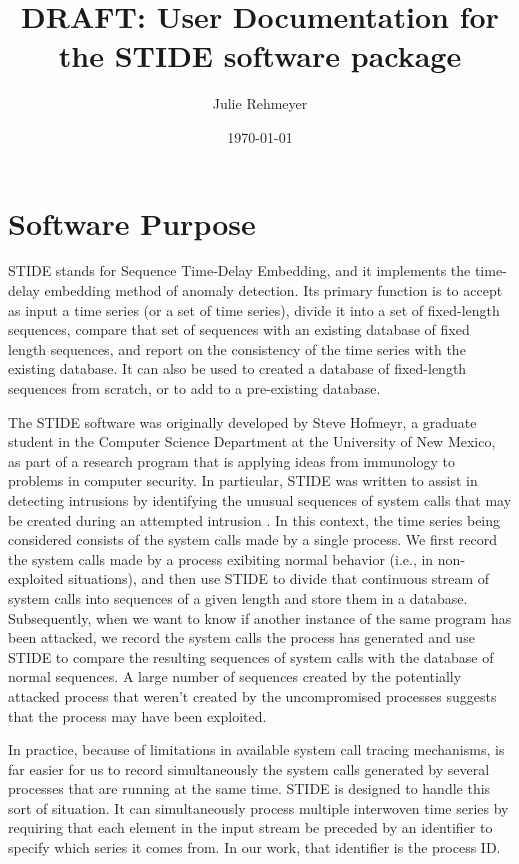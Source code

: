 \documentclass{amsart}
\title{DRAFT: User Documentation for the STIDE software package}
\author{Julie Rehmeyer}
\date{\today}
\begin{document}
\maketitle 


\section{Software Purpose} \label{sec:intro}
STIDE stands for Sequence Time-Delay Embedding, and it implements the
time-delay embedding method of anomaly detection.  Its primary
function is to accept as input a time series (or a set of time
series), divide it into a set of fixed-length sequences, compare that
set of sequences with an existing database of fixed length sequences,
and report on the consistency of the time series with the existing
database.  It can also be used to created a database of fixed-length
sequences from scratch, or to add to a pre-existing database.

The STIDE software was originally developed by Steve Hofmeyr, a
graduate student in the Computer Science Department at the University
of New Mexico, as part of a research program that is applying ideas
from immunology to problems in computer security.  In particular,
STIDE was written to assist in detecting intrusions by identifying the
unusual sequences of system calls that may be created during an
attempted intrusion \cite{lightweight, ci, principles, self}. In this
context, the time series being considered consists of the system calls
made by a single process.  We first record the system calls made by a
process exibiting normal behavior (i.e., in non-exploited situations),
and then use STIDE to divide that continuous stream of system calls
into sequences of a given length and store them in a database.
Subsequently, when we want to know if another instance of the same
program has been attacked, we record the system calls the process has
generated and use STIDE to compare the resulting sequences of system
calls with the database of normal sequences.  A large number of
sequences created by the potentially attacked process that weren't
created by the uncompromised processes suggests that the process may
have been exploited.

In practice, because of limitations in available system call tracing
mechanisms, is far easier for us to record simultaneously the system
calls generated by several processes that are running at the same
time.  STIDE is designed to handle this sort of situation.  It can
simultaneously process multiple interwoven time series by requiring
that each element in the input stream be preceded by an identifier to
specify which series it comes from.  In our work, that identifier is
the process ID.
\end{document}
